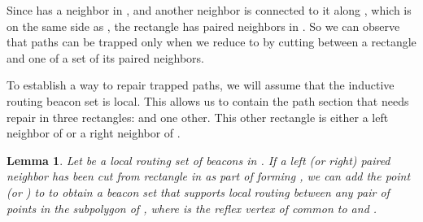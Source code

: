 \documentclass{article}
\newtheorem{lemma}{Lemma}
\begin{document}
	Since  has a neighbor  in , and another neighbor 
	is connected to it along , which is on the same side as ,
	the rectangle  has paired neighbors in .
	So we can observe that
	paths can be trapped only when we reduce  to  by cutting
	between a rectangle and one of a set of its paired neighbors.
	
	To establish a way to repair trapped paths, 
	we will assume that the inductive routing beacon set is local.  This allows us
	to contain the path section that needs repair in three rectangles:  and
	one other.  This other rectangle is either a left neighbor of  or a right
	neighbor of .

	\begin{lemma}\label{lem:repair}
		Let  be a local routing set of beacons in .
		If a left (or right) paired neighbor  has
		been cut from rectangle  in  as part of forming , we can add
		the point  (or ) to  to obtain a beacon set that supports local
		routing between any pair of points in the subpolygon  of , where  is the reflex
		vertex of  common to  and .
	\end{lemma}
\end{document}
